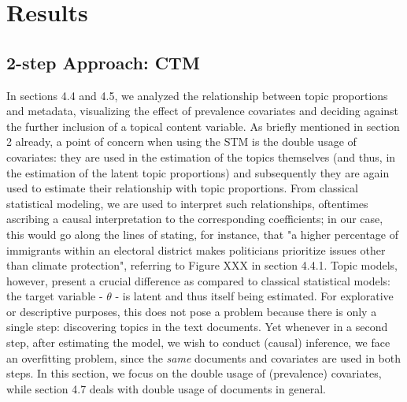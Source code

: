 \documentclass[12pt]{article}
\begin{document}
\section{Results}

\subsection{2-step Approach: CTM}

In sections 4.4 and 4.5, we analyzed the relationship between topic proportions and metadata, visualizing the effect of prevalence covariates and deciding against the further inclusion of a topical content variable. As briefly mentioned in section 2 already, a point of concern when using the STM is the double usage of covariates: they are used in the estimation of the topics themselves (and thus, in the estimation of the latent topic proportions) and subsequently they are again used to estimate their relationship with topic proportions. From classical statistical modeling, we are used to interpret such relationships, oftentimes ascribing a causal interpretation to the corresponding coefficients; in our case, this would go along the lines of stating, for instance, that "a higher percentage of immigrants within an electoral district makes politicians prioritize issues other than climate protection", referring to Figure XXX in section 4.4.1. Topic models, however, present a crucial difference as compared to classical statistical models: the target variable - $\theta$ - is latent and thus itself being estimated. For explorative or descriptive purposes, this does not pose a problem because there is only a single step: discovering topics in the text documents. Yet whenever in a second step, after estimating the model, we wish to conduct (causal) inference, we face an overfitting problem, since the \textit{same} documents and covariates are used in both steps. In this section, we focus on the double usage of (prevalence) covariates, while section 4.7 deals with double usage of documents in general.
\end{document}
